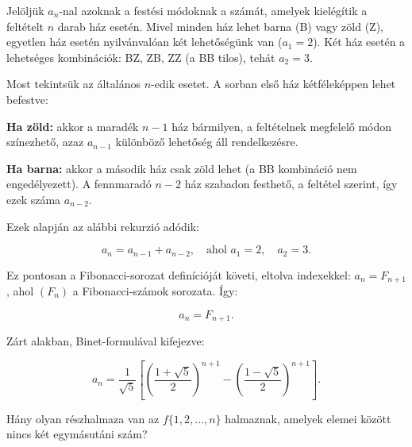 \begin{solution}
Jelöljük $a_{n}$-nal azoknak a festési módoknak a számát, amelyek
kielégítik a feltételt $n$ darab ház esetén. Mivel minden ház lehet
barna (B) vagy zöld (Z), egyetlen ház esetén nyilvánvalóan két lehetőségünk
van ($a_{1}=2$). Két ház esetén a lehetséges kombinációk: BZ, ZB,
ZZ (a BB tilos), tehát $a_{2}=3$.

Most tekintsük az általános $n$-edik esetet. A sorban első ház kétféleképpen
lehet befestve:

\textbf{Ha zöld:} akkor a maradék $n-1$ ház bármilyen, a feltételnek
megfelelő módon színezhető, azaz $a_{n-1}$ különböző lehetőség áll
rendelkezésre.

\textbf{Ha barna:} akkor a második ház csak zöld lehet (a BB kombináció
nem engedélyezett). A fennmaradó $n-2$ ház szabadon festhető, a feltétel
szerint, így ezek száma $a_{n-2}$.

Ezek alapján az alábbi rekurzió adódik:

\[
a_{n}=a_{n-1}+a_{n-2},\quad\text{ahol }a_{1}=2,\quad a_{2}=3.
\]

Ez pontosan a Fibonacci-sorozat definícióját követi, eltolva indexekkel:
$a_{n}=F_{n+1}$, ahol $(F_{n})$ a Fibonacci-számok sorozata. Így:

\[
a_{n}=F_{n+1}.
\]

Zárt alakban, Binet-formulával kifejezve:

\[
a_{n}=\frac{1}{\sqrt{5}}\left[\left(\frac{1+\sqrt{5}}{2}\right)^{n+1}-\left(\frac{1-\sqrt{5}}{2}\right)^{n+1}\right].
\]
\end{solution}
\begin{extraproblem}
Hány olyan részhalmaza van az $f\{1,2,\ldots,n\}$ halmaznak, amelyek
elemei között nincs két egymásutáni szám? 
\end{extraproblem}

